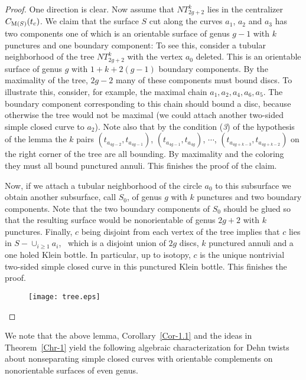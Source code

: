 \documentclass[11 pt]{amsart}
\theoremstyle{definition}
\begin{document}
\begin{proof}
One direction is clear. Now assume that $NT_{2g+2}^{k}$ lies in the
centralizer $C_{{\rm M}(S)}(t_c)$. We claim that the surface $S$ cut
along the curves $a_1$, $a_2$ and $a_3$ has two components one of
which is an orientable surface of genus $g-1$ with $k$ punctures and
one boundary component: To see this, consider a tubular neighborhood
of the tree $NT_{2g+2}^k$ with the vertex $a_0$ deleted. This is an
orientable surface of genus $g$ with $1+k+2(g-1)$ boundary
components.  By the maximality of the tree, $2g-2$ many of these
components must bound discs. To illustrate this, consider, for
example, the maximal chain $a_1,a_2,a_4,a_6,a_5$. The boundary
component corresponding to this chain should bound a disc, because
otherwise the tree would not be maximal (we could attach another
two-sided simple closed curve to $a_2$). Note also that by the
condition ({\it 3}) of the hypothesis of the lemma the $k$ pairs
$(t_{a_{4g-2}},t_{a_{4g-1}})$, $(t_{a_{4g-1}},t_{a_{4g}})$,
$\cdots$, $(t_{a_{4g+k-3}},t_{a_{4g+k-2}})$ on the right corner of
the tree are all bounding. By maximality and the coloring they must
all bound punctured annuli. This finishes the proof of the claim.

Now, if we attach a tubular neighborhood of the circle $a_0$ to this
subsurface we obtain another subsurface, call $S_0$, of genus $g$
with $k$ punctures and two boundary components. Note that the two
boundary components of $S_0$ should be glued so that the resulting
surface would be nonorientable of genus $2g+2$ with $k$ punctures.
Finally, $c$ being disjoint from each vertex of the tree implies
that $c$ lies in $S-\cup_{i\geq1} a_i$, \ which is a disjoint union
of $2g$ discs, $k$ punctured annuli and a one holed Klein bottle. In
particular, up to isotopy, $c$ is the unique nontrivial two-sided
simple closed curve in this punctured Klein bottle.  This finishes
the proof.

\begin{figure}[hbt]
 \begin{center}
 \texttt{[image: tree.eps]}
\caption {} \label{tree}
\end{center}
\end{figure}
\end{proof}

We note that the above lemma, Corollary~\ref{Cor-1.1} and the ideas
in Theorem~\ref{Chr-1} yield the following algebraic
characterization for Dehn twists about nonseparating simple closed
curves with orientable complements on nonorientable surfaces of even
genus.
\end{document}
